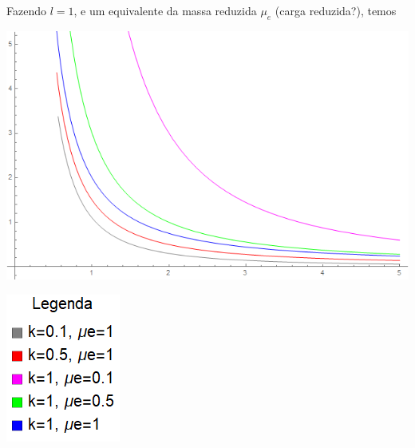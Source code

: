 \documentclass[]{IMTexam}
\begin{document}
\begin{questions}
\begin{parts}
		\begin{solution}
			Fazendo $ l=1 $, e um equivalente da massa reduzida $ \mu_e $ (carga reduzida?), temos

			\begin{center}
				\begin{minipage}{0.8\linewidth}
					\centering
					\includegraphics[width=1\linewidth]{Graph2}
				\end{minipage}\hfill
				\begin{minipage}{0.15\linewidth}
					\centering
					\includegraphics[width=1\linewidth]{leg2}
				\end{minipage}
			\end{center}
		\end{solution}


\end{parts}
\end{questions}
\end{document}
